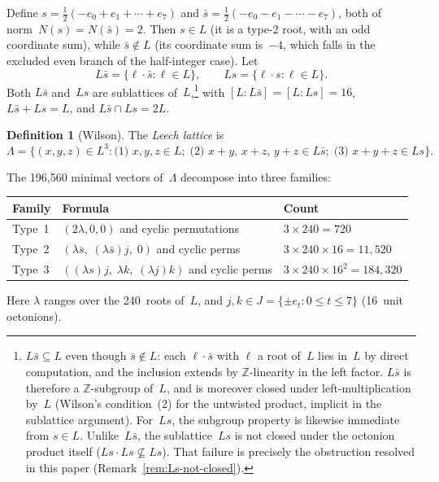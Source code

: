 \documentclass[twoside,english]{paper}
\numberwithin{equation}{section}
\numberwithin{figure}{section}
\theoremstyle{definition}
\newtheorem{definition}[theorem]{Definition}
\theoremstyle{remark}
\newcommand{\ZZ}{\mathbb{Z}}
\newcommand{\LL}{\Lambda}             %
\newcommand{\Nrm}{N}                  %
\begin{document}
Define $s = \tfrac{1}{2}(-e_0 + e_1 + \cdots + e_7)$ and
$\bar{s} = \tfrac{1}{2}(-e_0 - e_1 - \cdots - e_7)$, both of
norm~$\Nrm(s) = \Nrm(\bar{s}) = 2$.  Then $s \in L$ (it is a
type-2 root, with an odd coordinate sum), while $\bar{s} \notin L$
(its coordinate sum is~$-4$, which falls in the excluded even
branch of the half-integer case).  Let
\[
  L\bar{s} = \{ \ell \cdot \bar{s} : \ell \in L \}, \qquad
  Ls = \{ \ell \cdot s : \ell \in L \}.
\]
Both $L\bar{s}$ and~$Ls$ are sublattices of~$L$,\footnote{$L\bar
s \subseteq L$ even though $\bar s \notin L$: each $\ell \cdot
\bar s$ with $\ell$ a root of~$L$ lies in~$L$ by direct
computation, and the inclusion extends by $\ZZ$-linearity in the
left factor. $L\bar s$ is therefore a $\ZZ$-subgroup of~$L$, and
is moreover closed under left-multiplication by~$L$ (Wilson's
condition~(2) for the untwisted product, implicit in the sublattice
argument). For~$Ls$, the subgroup
property is likewise immediate from $s \in L$.  Unlike~$L\bar s$,
the sublattice~$Ls$ is not closed under the octonion product
itself ($Ls \cdot Ls \not\subseteq Ls$).  That failure is
precisely the obstruction resolved in this paper
(Remark~\ref{rem:Ls-not-closed}).}
with
$[L : L\bar{s}] = [L : Ls] = 16$,
$L\bar{s} + Ls = L$, and $L\bar{s} \cap Ls = 2L$.

\begin{definition}[Wilson]\label{def:wilson-leech}
The \emph{Leech lattice} is
\[
  \LL = \bigl\{ (x,y,z) \in L^3 :
    \text{(1) } x,y,z \in L;\;
    \text{(2) } x{+}y,\, x{+}z,\, y{+}z \in L\bar{s};\;
    \text{(3) } x{+}y{+}z \in Ls
  \bigr\}.
\]
\end{definition}

The 196{,}560 minimal vectors of~$\LL$ decompose into three families:

\smallskip
\begin{tabular}{@{}lll@{}}
\toprule
Family & Formula & Count \\
\midrule
Type~1 & $(2\lambda, 0, 0)$ and cyclic permutations & $3 \times 240 = 720$ \\
Type~2 & $(\lambda\bar{s},\; (\lambda\bar{s})j,\; 0)$ and cyclic
  perms & $3 \times 240 \times 16 = 11{,}520$ \\
Type~3 & $((\lambda s)j,\; \lambda k,\; (\lambda j)k)$ and cyclic
  perms & $3 \times 240 \times 16^2 = 184{,}320$ \\
\bottomrule
\end{tabular}
\smallskip

\noindent
Here $\lambda$ ranges over the 240~roots of~$L$, and
$j, k \in J = \{\pm e_t : 0 \le t \le 7\}$ (16~unit octonions).
\end{document}
